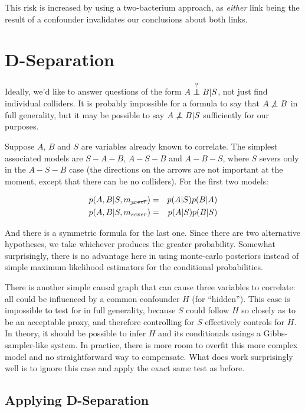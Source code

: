 \documentclass[letterpaper]{article}
\newcommand\indep{\protect\mathpalette{\protect\independenT}{\perp}}
\def\independenT#1#2{\mathrel{\rlap{$#1#2$}\mkern2mu{#1#2}}}
\begin{document}
This risk is increased by using a two-bacterium approach, as
\textit{either} link being the result of a confounder invalidates our
conclusions about both links.

\section{D-Separation}

Ideally, we'd like to answer questions of the form
$A\overset{?}{\indep}B|S$, not just find individual colliders.
It is probably
impossible for a formula to say that $A\not\indep B$ in full
generality, but it may be possible to say $A\not\indep B|S$
sufficiently for our purposes.

Suppose $A$, $B$ and $S$ are variables already known to correlate.  The simplest
associated models are $S-A-B$, $A-S-B$ and $A-B-S$, where $S$ severs only in
the $A-S-B$ case (the directions on the arrows are not important at the
moment, except that there can be no colliders).  For the first two
models:

\begin{eqnarray*}
  p(A,B|S,m_{\cancel{sever}}) & = & p(A|S)p(B|A) \\
  p(A,B|S,m_{sever}) & = & p(A|S)p(B|S)
\end{eqnarray*}

And there is a symmetric formula for the last one.  Since there are
two alternative hypotheses, we take whichever produces the greater
probability.  Somewhat surprisingly, there is no advantage here in
using monte-carlo posteriors instead of simple maximum likelihood estimators
for the conditional probabilities.

There is another simple causal graph that can cause three variables to
correlate: all could be influenced by a common confounder $H$ (for
``hidden'').  This case is impossible to test for in full generality,
because $S$ could follow $H$ so closely as to be an acceptable proxy,
and therefore controlling for $S$ effectively controls for $H$.  In
theory, it should be possible to infer $H$ and its conditionals usings
a Gibbs-sampler-like system.  In practice, there is more room to
overfit this more complex model and no straightforward way to
compensate.  What does work surprisingly well is to ignore this case
and apply the exact same test as before.

\subsection{Applying D-Separation}
\end{document}
